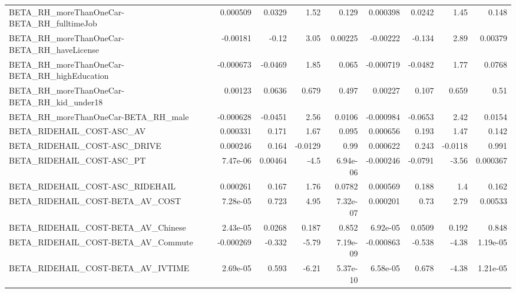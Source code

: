 \begin{tabular}{lrrrrrrrr}
BETA\_RH\_moreThanOneCar-BETA\_RH\_fulltimeJob         &    0.000509 &       0.0329 &     1.52 &    0.129 &   0.000398 &      0.0242 &         1.45 &         0.148 \\
BETA\_RH\_moreThanOneCar-BETA\_RH\_haveLicense         &    -0.00181 &        -0.12 &     3.05 &  0.00225 &   -0.00222 &      -0.134 &         2.89 &       0.00379 \\
BETA\_RH\_moreThanOneCar-BETA\_RH\_highEducation       &   -0.000673 &      -0.0469 &     1.85 &    0.065 &  -0.000719 &     -0.0482 &         1.77 &        0.0768 \\
BETA\_RH\_moreThanOneCar-BETA\_RH\_kid\_under18         &     0.00123 &       0.0636 &    0.679 &    0.497 &    0.00227 &       0.107 &        0.659 &          0.51 \\
BETA\_RH\_moreThanOneCar-BETA\_RH\_male                &   -0.000628 &      -0.0451 &     2.56 &   0.0106 &  -0.000984 &     -0.0653 &         2.42 &        0.0154 \\
BETA\_RIDEHAIL\_COST-ASC\_AV                          &    0.000331 &        0.171 &     1.67 &    0.095 &   0.000656 &       0.193 &         1.47 &         0.142 \\
BETA\_RIDEHAIL\_COST-ASC\_DRIVE                       &    0.000246 &        0.164 &  -0.0129 &     0.99 &   0.000622 &       0.243 &      -0.0118 &         0.991 \\
BETA\_RIDEHAIL\_COST-ASC\_PT                          &    7.47e-06 &      0.00464 &     -4.5 & 6.94e-06 &  -0.000246 &     -0.0791 &        -3.56 &      0.000367 \\
BETA\_RIDEHAIL\_COST-ASC\_RIDEHAIL                    &    0.000261 &        0.167 &     1.76 &   0.0782 &   0.000569 &       0.188 &          1.4 &         0.162 \\
BETA\_RIDEHAIL\_COST-BETA\_AV\_COST                    &    7.28e-05 &        0.723 &     4.95 & 7.32e-07 &   0.000201 &        0.73 &         2.79 &       0.00533 \\
BETA\_RIDEHAIL\_COST-BETA\_AV\_Chinese                 &    2.43e-05 &       0.0268 &    0.187 &    0.852 &   6.92e-05 &      0.0509 &        0.192 &         0.848 \\
BETA\_RIDEHAIL\_COST-BETA\_AV\_Commute                 &   -0.000269 &       -0.332 &    -5.79 & 7.19e-09 &  -0.000863 &      -0.538 &        -4.38 &      1.19e-05 \\
BETA\_RIDEHAIL\_COST-BETA\_AV\_IVTIME                  &    2.69e-05 &        0.593 &    -6.21 & 5.37e-10 &   6.58e-05 &       0.678 &        -4.38 &      1.21e-05 \\

\end{tabular}
